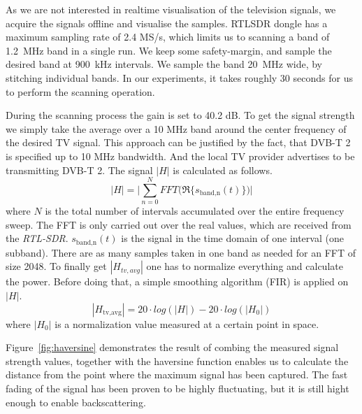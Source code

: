 As we are not interested in realtime visualisation of the television
signals, we acquire the signals offline and visualise the samples.
RTLSDR dongle has a maximum sampling rate of 2.4 MS/s, which limits us to
scanning a band of \SI{1.2}{\mega\hertz} band in a single run. We  keep some safety-margin, and
sample the desired band at \SI{900}{\kilo\hertz} intervals. We sample the band 
\SI{20}{\mega\hertz} wide, by stitching individual bands. In our experiments, it takes roughly 30
seconds for us to perform the scanning operation.


 
During the scanning process the gain is set to 40.2 dB. To get the
signal strength we simply take the average over a 10 MHz band around the
center frequency of the desired TV signal. This approach can be
justified by the fact, that DVB-T 2 is specified up to 10 MHz bandwidth.
And the local TV provider advertises to be transmitting DVB-T 2.
The signal \ensuremath{|H|} is calculated as follows.  
\begin{equation}
	|H| = \Biggl| \sum_{n=0}^N FFT\biggl( \Re\{ s_{\text{band,n}}(t) \} \biggr) \Biggr|
\end{equation}     where \ensuremath{N} is the total number of intervals
accumulated over the entire frequency sweep. The FFT is only carried out over
the real values, which are received from the \textit{RTL-SDR}.
\ensuremath{s_{\text{band,n}}(t)} is the signal in the time domain of one
interval (one subband). There are as many samples taken in one band as needed
for an FFT of size 2048. To finally get \ensuremath{|H_{tv,avg}|} one has to
normalize everything and calculate the power. Before doing that, a simple
smoothing algorithm (FIR) is applied on \ensuremath{|H|}.  
\begin{equation}
	|H_{\text{tv,avg}}| = 20 \cdot log (|H|) - 20 \cdot log(|H_0|)
\end{equation}   
where \ensuremath{|H_0|} is a normalization value measured at a certain point
in space. 

Figure~\ref{fig:haversine} demonstrates the result of combing the measured
signal strength values, together with the haversine function enables us to
calculate the distance from the point where the maximum signal has been
captured. The fast fading of the signal has been proven to be highly fluctuating, but it is still hight enough to enable backscattering.    

